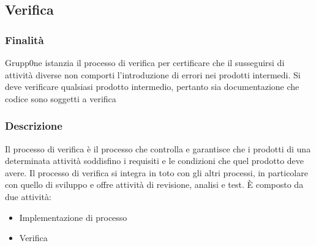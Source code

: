 \documentclass[../norme-di-progetto.tex]{subfiles}
\begin{document}
\subsection{Verifica}
\label{sub:verifica}
\subsubsection{Finalità}
\label{subs:finalita}
Grupp0ne istanzia il processo di verifica  per certificare che il susseguirsi di attività diverse non comporti l'introduzione di errori nei prodotti intermedi. Si deve verificare qualsiasi prodotto intermedio, pertanto sia documentazione che codice sono soggetti a verifica 
\subsubsection{Descrizione}
Il processo di verifica è il processo che controlla e garantisce che i prodotti di una determinata attività soddisfino i requisiti e le condizioni che quel prodotto deve avere. Il processo di verifica si integra in toto con gli altri processi, in particolare con quello di sviluppo e offre attività di revisione, analisi e test. È composto da due attività:
\begin{itemize}
	\item Implementazione di processo
	\item Verifica 
\end{itemize} 
\end{document}
